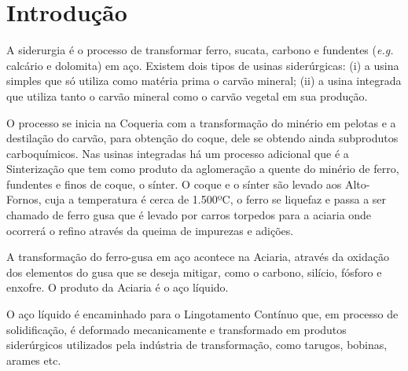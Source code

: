 \chapter[Introdução]{Introdução}

 A siderurgia é o processo de transformar ferro, sucata, carbono e fundentes (\textit{e.g.} calcário e dolomita) em aço. Existem dois tipos de usinas siderúrgicas: (i) a usina simples que só utiliza como matéria prima o carvão mineral; (ii) a usina integrada que utiliza tanto o carvão mineral como o carvão vegetal em sua produção.
 
 O processo se inicia na Coqueria com a transformação do minério em pelotas e a destilação do carvão, para obtenção do coque, dele se obtendo ainda subprodutos carboquímicos.
%
 Nas usinas integradas há um processo adicional que é a Sinterização que tem como produto da aglomeração a quente do minério de ferro, fundentes e finos de coque, o sínter.
%
 O coque e o sínter são levado aos Alto-Fornos, cuja a temperatura é cerca de 1.500ºC, o ferro se liquefaz e passa a ser chamado de ferro gusa que é levado por carros torpedos para a aciaria onde ocorrerá o refino através da queima de impurezas e adições.
  
A transformação do ferro-gusa em aço acontece na Aciaria, através da oxidação dos elementos do gusa que se deseja mitigar, como o carbono, silício, fósforo e enxofre. O produto da Aciaria é o aço líquido.

 O aço líquido é encaminhado para o Lingotamento Contínuo que, em processo de solidificação, é deformado mecanicamente e transformado em produtos siderúrgicos utilizados pela indústria de transformação, como tarugos, bobinas, arames etc. \cite{aco}

